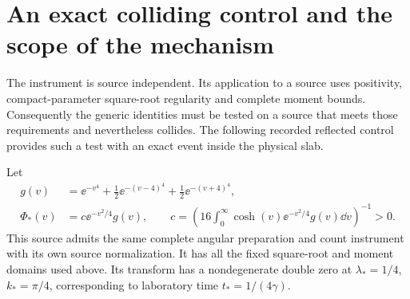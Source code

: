 \section{An exact colliding control and the scope of the mechanism}\label{sec:control}

The instrument is source independent. Its application to a source uses
positivity, compact-parameter square-root regularity and complete moment
bounds. Consequently the generic identities must be tested on a source
that meets those requirements and nevertheless collides. The following
recorded reflected control \cite[Section 4, (9)--(12)]{ReflectedControl}
provides such a test with an exact event inside the physical slab.

\begin{theorem}\label{thm:control}
Let
\begin{align}
 g(v)&=\ee^{-v^4}+\tfrac12\ee^{-(v-4)^4}
                     +\tfrac12\ee^{-(v+4)^4},\label{eq:gcontrol}\\
 \Phi_*(v)&=c\ee^{-v^2/4}g(v),\qquad
 c=\left(16\int_0^\infty\cosh(v)\ee^{-v^2/4}g(v)\dd v\right)^{-1}>0.
 \label{eq:controlsource}
\end{align}
This source admits the same complete angular preparation and count
instrument with its own source normalization. It has all the fixed
square-root and moment domains used above. Its transform has a nondegenerate
double zero at $\lambda_*=1/4$, $k_*=\pi/4$, corresponding to laboratory
time $t_*=1/(4\gamma)$.
\end{theorem}
